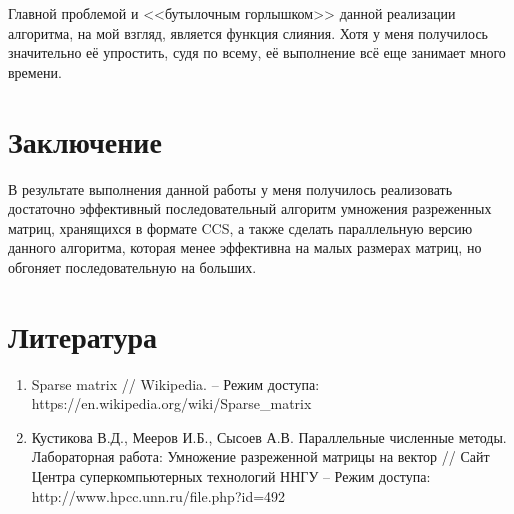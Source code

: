 \documentclass[a4paper,12pt]{article}
\begin{document}
Главной проблемой и <<бутылочным горлышком>> данной реализации алгоритма, на мой взгляд, является функция слияния. Хотя у меня получилось значительно её упростить, судя по всему, её выполнение всё еще занимает много времени.

\newpage
\section{Заключение}
В результате выполнения данной работы у меня получилось реализовать достаточно эффективный последовательный алгоритм умножения разреженных матриц, хранящихся в формате CCS, а также сделать параллельную версию данного алгоритма, которая менее эффективна на малых размерах матриц, но обгоняет последовательную на больших.
\newpage
\section{Литература}
\begin{enumerate}
\item Sparse matrix // Wikipedia. -- Режим доступа: https://en.wikipedia.org/wiki/Sparse\_matrix
\item Кустикова В.Д., Мееров И.Б., Сысоев А.В. Параллельные численные методы. Лабораторная работа:
Умножение разреженной матрицы на вектор // Сайт Центра суперкомпьютерных технологий ННГУ -- Режим доступа: http://www.hpcc.unn.ru/file.php?id=492

\end{enumerate}

\newpage
\end{document}

